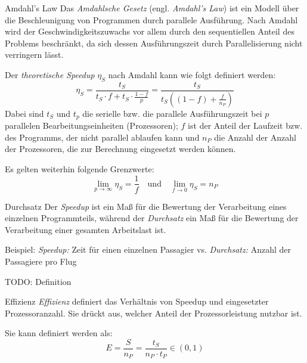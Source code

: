 \begin{defi}{Amdahl's Law}
    Das \emph{Amdahlsche Gesetz} (engl. \emph{Amdahl's Law}) ist ein Modell über die Beschleunigung von Programmen durch parallele Ausführung.
    Nach Amdahl wird der Geschwindigkeitszuwachs vor allem durch den sequentiellen Anteil des Problems beschränkt, da sich dessen Ausführungszeit durch Parallelisierung nicht verringern lässt.
    
    Der \emph{theoretische Speedup} $\eta_S$ nach Amdahl kann wie folgt definiert werden:
    \[
        \eta_S = \frac{t_S}{t_S \cdot f + t_S \cdot \frac{1-f}{p} } = \frac{t_S}{t_S \left((1 - f) + \frac{f}{n_P}\right)}
    \]
    Dabei sind $t_S$ und $t_p$ die serielle bzw. die parallele Ausführungszeit bei $p$ parallelen Bearbeitungseinheiten (Prozessoren);
    $f$ ist der Anteil der Laufzeit bzw. des Programms, der nicht parallel ablaufen kann und $n_P$ die Anzahl der Anzahl der Prozessoren, die zur Berechnung eingesetzt werden können.
    
    Es gelten weiterhin folgende Grenzwerte:
    \[
        \lim_{p \to \infty} \eta_S = \frac{1}{f} \quad \text{und} \quad \lim_{f \to 0 } \eta_S = n_P
    \]
\end{defi}

\begin{bonus}{Durchsatz}
    Der \emph{Speedup} ist ein Maß für die Bewertung der Verarbeitung eines einzelnen Programmteils, 
    während der \emph{Durchsatz} ein Maß für die Bewertung der Verarbeitung einer gesamten Arbeitslast ist.
    
    Beispiel: \emph{Speedup:} Zeit für einen einzelnen Passagier vs. 
    \emph{Durchsatz:} Anzahl der Passagiere pro Flug
    
    TODO: Definition
\end{bonus}

\begin{defi}{Effizienz}
    \emph{Effizienz} definiert das Verhältnis von Speedup und eingesetzter Prozessoranzahl.
    Sie drückt aus, welcher Anteil der Prozessorleistung nutzbar ist.
    
    Sie kann definiert werden als:
    \[
        E = \frac{S}{n_P} = \frac{t_S}{n_P\cdot t_P} \in (0, 1)
    \]
\end{defi}

